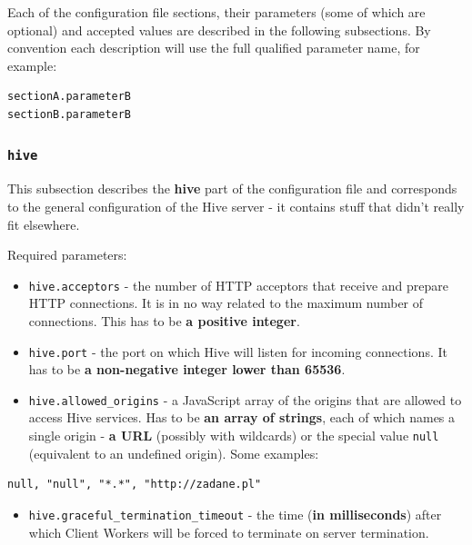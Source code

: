 \documentclass[a4paper]{article}
\begin{document}
Each of the configuration file sections, their parameters (some of which are optional) and accepted values are described in the following subsections. By convention each description will use the full qualified parameter name, for example:


\begin{verbatim}
sectionA.parameterB
sectionB.parameterB
\end{verbatim}
\subsubsection{\texttt{hive}}
\label{sec-3-1-1}

This subsection describes the \textbf{hive} part of the configuration file and corresponds to the general configuration of the Hive server - it contains stuff that didn't really fit elsewhere.

\noindent
Required parameters:

\begin{itemize}
\item \texttt{hive.acceptors} - the number of HTTP acceptors that receive and prepare HTTP connections. It is in no way related to the maximum number of connections. This has to be \textbf{a positive integer}.
\item \texttt{hive.port} - the port on which Hive will listen for incoming connections. It has to be \textbf{a non-negative integer lower than 65536}.
\item \texttt{hive.allowed\_origins} - a JavaScript array of the origins that are allowed to access Hive services. Has to be \textbf{an array of strings}, each of which names a single origin - \textbf{a URL} (possibly with wildcards) or the special value \texttt{null} (equivalent to an undefined origin). Some examples:
\end{itemize}


\begin{verbatim}
null, "null", "*.*", "http://zadane.pl"
\end{verbatim}




\label{ref-graceful_config}

\begin{itemize}
\item \texttt{hive.graceful\_termination\_timeout} - the time (\textbf{in milliseconds}) after which Client Workers will be forced to terminate on server termination.
\end{itemize}
\end{document}
